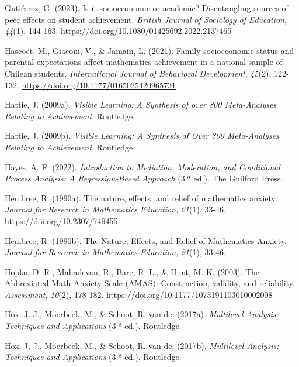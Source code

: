 \documentclass[
  spanish,
  a4paper,
  oneside]{scrbook}
\newlength{\cslhangindent}
\newenvironment{CSLReferences}[2] %
 {\begin{list}{}{%
  \setlength{\itemindent}{0pt}
  \setlength{\leftmargin}{0pt}
  \setlength{\parsep}{0pt}
  \ifodd #1
   \setlength{\leftmargin}{\cslhangindent}
   \setlength{\itemindent}{-1\cslhangindent}
  \fi
  \setlength{\itemsep}{#2\baselineskip}}}
 {\end{list}}
\begin{document}
\begin{CSLReferences}{1}{0}
Gutiérrez, G. (2023). Is it socioeconomic or academic? Disentangling
sources of peer effects on student achievement. \emph{British Journal of
Sociology of Education}, \emph{44}(1), 144-163.
\url{https://doi.org/10.1080/01425692.2022.2137465}

Hascoët, M., Giaconi, V., \& Jamain, L. (2021). Family socioeconomic
status and parental expectations affect mathematics achievement in a
national sample of Chilean students. \emph{International Journal of
Behavioral Development}, \emph{45}(2), 122-132.
\url{https://doi.org/10.1177/0165025420965731}

Hattie, J. (2009a). \emph{Visible Learning: A Synthesis of over 800
Meta-Analyses Relating to Achievement}. Routledge.

Hattie, J. (2009b). \emph{Visible Learning: A Synthesis of Over 800
Meta-Analyses Relating to Achievement}. Routledge.

Hayes, A. F. (2022). \emph{Introduction to Mediation, Moderation, and
Conditional Process Analysis: A Regression-Based Approach} (3.ª ed.).
The Guilford Press.

Hembree, R. (1990a). The nature, effects, and relief of mathematics
anxiety. \emph{Journal for Research in Mathematics Education},
\emph{21}(1), 33-46. \url{https://doi.org/10.2307/749455}

Hembree, R. (1990b). The Nature, Effects, and Relief of Mathematics
Anxiety. \emph{Journal for Research in Mathematics Education},
\emph{21}(1), 33-46.

Hopko, D. R., Mahadevan, R., Bare, R. L., \& Hunt, M. K. (2003). The
Abbreviated Math Anxiety Scale (AMAS): Construction, validity, and
reliability. \emph{Assessment}, \emph{10}(2), 178-182.
\url{https://doi.org/10.1177/1073191103010002008}

Hox, J. J., Moerbeek, M., \& Schoot, R. van de. (2017a).
\emph{Multilevel Analysis: Techniques and Applications} (3.ª ed.).
Routledge.

Hox, J. J., Moerbeek, M., \& Schoot, R. van de. (2017b).
\emph{Multilevel Analysis: Techniques and Applications} (3.ª ed.).
Routledge.


\end{CSLReferences}
\end{document}
